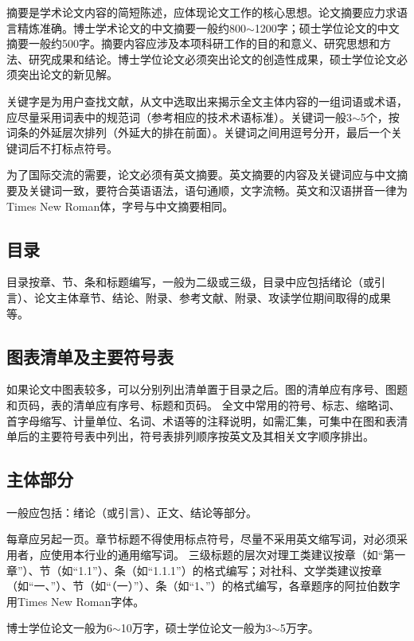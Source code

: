 摘要是学术论文内容的简短陈述，应体现论文工作的核心思想。论文摘要应力求语言精炼准确。博士学术论文的中文摘要一般约800$\sim$1200字；硕士学位论文的中文摘要一般约500字。摘要内容应涉及本项科研工作的目的和意义、研究思想和方法、研究成果和结论。博士学位论文必须突出论文的创造性成果，硕士学位论文必须突出论文的新见解。

关键字是为用户查找文献，从文中选取出来揭示全文主体内容的一组词语或术语，应尽量采用词表中的规范词（参考相应的技术术语标准）。关键词一般3$\sim$5个，按词条的外延层次排列（外延大的排在前面）。关键词之间用逗号分开，最后一个关键词后不打标点符号。

为了国际交流的需要，论文必须有英文摘要。英文摘要的内容及关键词应与中文摘要及关键词一致，要符合英语语法，语句通顺，文字流畅。英文和汉语拼音一律为Times New Roman体，字号与中文摘要相同。

\subsection{目录}

目录按章、节、条和标题编写，一般为二级或三级，目录中应包括绪论（或引言）、论文主体章节、结论、附录、参考文献、附录、攻读学位期间取得的成果等。

\subsection{图表清单及主要符号表}

如果论文中图表较多，可以分别列出清单置于目录之后。图的清单应有序号、图题和页码，表的清单应有序号、标题和页码。
全文中常用的符号、标志、缩略词、首字母缩写、计量单位、名词、术语等的注释说明，如需汇集，可集中在图和表清单后的主要符号表中列出，符号表排列顺序按英文及其相关文字顺序排出。

\subsection{主体部分}

一般应包括：绪论（或引言）、正文、结论等部分。

每章应另起一页。章节标题不得使用标点符号，尽量不采用英文缩写词，对必须采用者，应使用本行业的通用缩写词。
三级标题的层次对理工类建议按章（如“第一章”）、节（如“1.1”）、条（如“1.1.1”）的格式编写；对社科、文学类建议按章（如“一、”）、节（如“（一）”）、条（如“1、”）的格式编写，各章题序的阿拉伯数字用Times New Roman字体。

博士学位论文一般为6$\sim$10万字，硕士学位论文一般为3$\sim$5万字。

